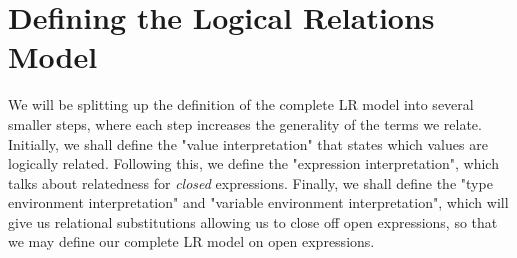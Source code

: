 \documentclass[twoside,11pt,openright]{report}
\theoremstyle{definition}
\begin{document}
\section{Defining the Logical Relations Model}
We will be splitting up the definition of the complete LR model into several smaller steps, where each step increases the generality of the terms we relate.
Initially, we shall define the "value interpretation" that states which values are logically related. Following this, we define the "expression interpretation", which talks about relatedness for \textit{closed} expressions. Finally, we shall define the "type environment interpretation" and "variable environment interpretation", which will give us relational substitutions allowing us to close off open expressions, so that we may define our complete LR model on open expressions.
\end{document}
